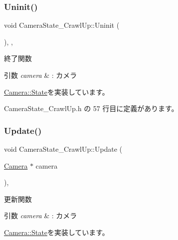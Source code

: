 \subsubsection{\texorpdfstring{Uninit()}{Uninit()}}
{\footnotesize\ttfamily void Camera\+State\+\_\+\+Crawl\+Up\+::\+Uninit (\begin{DoxyParamCaption}{ }\end{DoxyParamCaption})\hspace{0.3cm}{\ttfamily [inline]}, {\ttfamily [override]}, {\ttfamily [virtual]}}



終了関数 


\begin{DoxyParams}{引数}
{\em camera} & \+: カメラ \\
\hline
\end{DoxyParams}


\mbox{\hyperlink{class_camera_1_1_state_adb3f43b6c3f8100da7877867180e804b}{Camera\+::\+State}}を実装しています。



 Camera\+State\+\_\+\+Crawl\+Up.\+h の 57 行目に定義があります。

\mbox{\label{class_camera_state___crawl_up_aaebd2634f1677b7c00e6761ed91e1264}} 
\subsubsection{\texorpdfstring{Update()}{Update()}}
{\footnotesize\ttfamily void Camera\+State\+\_\+\+Crawl\+Up\+::\+Update (\begin{DoxyParamCaption}\item[{\mbox{\hyperlink{class_camera}{Camera}} $\ast$}]{camera }\end{DoxyParamCaption})\hspace{0.3cm}{\ttfamily [override]}, {\ttfamily [virtual]}}



更新関数 


\begin{DoxyParams}{引数}
{\em camera} & \+: カメラ \\
\hline
\end{DoxyParams}


\mbox{\hyperlink{class_camera_1_1_state_a2d41e0cb783666bae6c6ea167fcc7874}{Camera\+::\+State}}を実装しています。



